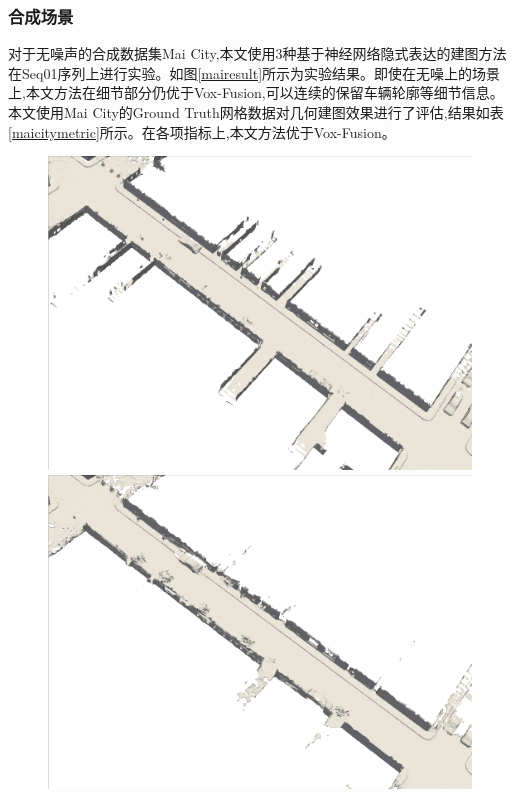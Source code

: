 \subsubsection{合成场景}
对于无噪声的合成数据集Mai City,本文使用3种基于神经网络隐式表达的建图方法在Seq01序列上进行实验。如图\ref{mairesult}所示为实验结果。即使在无噪上的场景上,本文方法在细节部分仍优于Vox-Fusion,可以连续的保留车辆轮廓等细节信息。本文使用Mai City的Ground Truth网格数据对几何建图效果进行了评估,结果如表\ref{maicitymetric}所示。在各项指标上,本文方法优于Vox-Fusion。
\begin{figure}[htbp]
    \centering
\begin{minipage}{0.5\linewidth}
    \centering
    \includegraphics[width=1\linewidth]{figures/mai_3_vox.png}
\end{minipage}\hfill
\begin{minipage}{0.5\linewidth}
    \centering
    \includegraphics[width=1\linewidth]{figures/mai_3_bce.png}

\end{minipage}
\end{figure}
